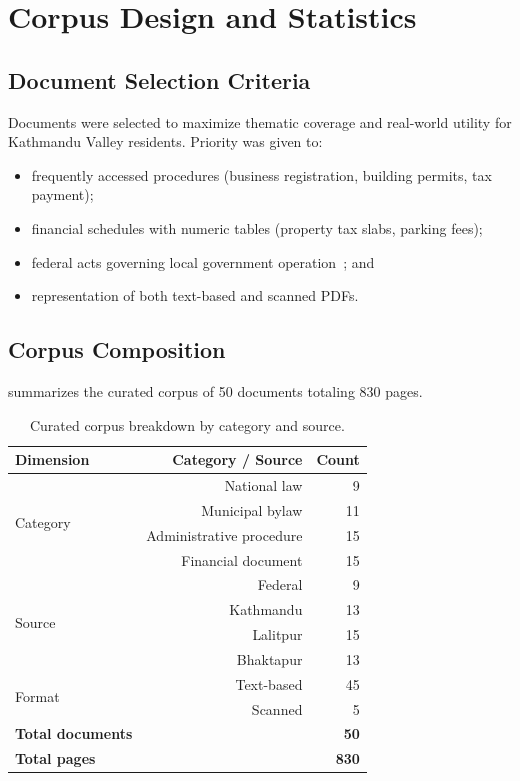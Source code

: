 \chapter{Corpus Design and Statistics}
\label{ch:corpus}

\section{Document Selection Criteria}
Documents were selected to maximize thematic coverage and real-world utility for Kathmandu Valley residents. Priority was given to:
\begin{itemize}[leftmargin=*]
  \item frequently accessed procedures (business registration, building permits, tax payment);
  \item financial schedules with numeric tables (property tax slabs, parking fees);
  \item federal acts governing local government operation~\cite{local_gov_act_2074}; and
  \item representation of both text-based and scanned PDFs.
\end{itemize}

\section{Corpus Composition}
 summarizes the curated corpus of 50 documents totaling 830 pages.

\begin{table}[H]
  \centering
  \caption{Curated corpus breakdown by category and source.}
  \label{tab:corpus-breakdown}
  \begin{tabular}{@{}lrr@{}}
    \toprule
    \textbf{Dimension} & \textbf{Category / Source} & \textbf{Count} \\
    \midrule
    \multirow{4}{*}{Category} & National law & 9 \\
    & Municipal bylaw & 11 \\
    & Administrative procedure & 15 \\
    & Financial document & 15 \\
    \midrule
    \multirow{4}{*}{Source} & Federal & 9 \\
    & Kathmandu & 13 \\
    & Lalitpur & 15 \\
    & Bhaktapur & 13 \\
    \midrule
    \multirow{2}{*}{Format} & Text-based & 45 \\
    & Scanned & 5 \\
    \midrule
    \textbf{Total documents} & & \textbf{50} \\
    \textbf{Total pages} & & \textbf{830} \\
    \bottomrule
  \end{tabular}
\end{table}

